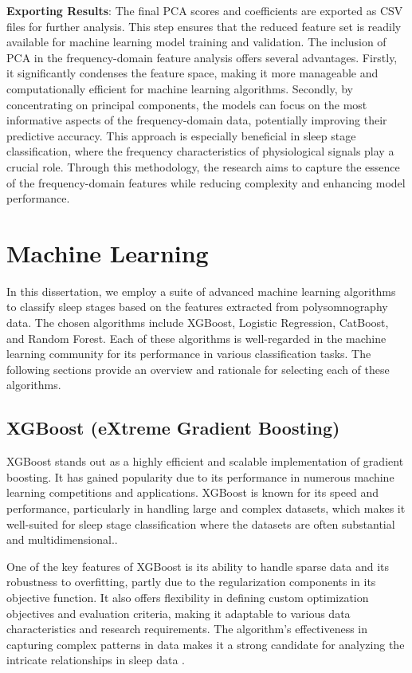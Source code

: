 \documentclass[12pt, a4paper,oneside]{book}
\numberwithin{equation}{section}
\begin{document}
\textbf{Exporting Results}: The final PCA scores and coefficients are exported as CSV files for further analysis. This step ensures that the reduced feature set is readily available for machine learning model training and validation.
\newline\newline
The inclusion of PCA in the frequency-domain feature analysis offers several advantages. Firstly, it significantly condenses the feature space, making it more manageable and computationally efficient for machine learning algorithms. Secondly, by concentrating on principal components, the models can focus on the most informative aspects of the frequency-domain data, potentially improving their predictive accuracy. This approach is especially beneficial in sleep stage classification, where the frequency characteristics of physiological signals play a crucial role. Through this methodology, the research aims to capture the essence of the frequency-domain features while reducing complexity and enhancing model performance.
\section{Machine Learning}
In this dissertation, we employ a suite of advanced machine learning algorithms to classify sleep stages based on the features extracted from polysomnography data. The chosen algorithms include XGBoost, Logistic Regression, CatBoost, and Random Forest. Each of these algorithms is well-regarded in the machine learning community for its performance in various classification tasks. The following sections provide an overview and rationale for selecting each of these algorithms.
\subsection{XGBoost (eXtreme Gradient Boosting)}
XGBoost stands out as a highly efficient and scalable implementation of gradient boosting. It has gained popularity due to its performance in numerous machine learning competitions and applications. XGBoost is known for its speed and performance, particularly in handling large and complex datasets, which makes it well-suited for sleep stage classification where the datasets are often substantial and multidimensional.\cite{Chen2016}.

One of the key features of XGBoost is its ability to handle sparse data and its robustness to overfitting, partly due to the regularization components in its objective function. It also offers flexibility in defining custom optimization objectives and evaluation criteria, making it adaptable to various data characteristics and research requirements. The algorithm's effectiveness in capturing complex patterns in data makes it a strong candidate for analyzing the intricate relationships in sleep data \cite{Chen2016}.
\end{document}
